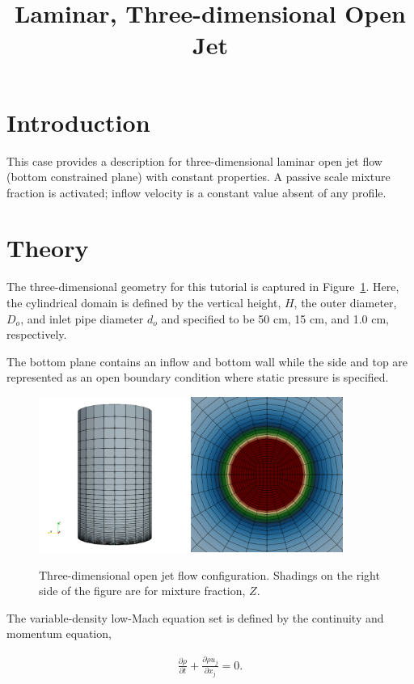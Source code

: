 \documentclass{article}
\title{Laminar, Three-dimensional Open Jet}
\date{}
\begin{document}
\maketitle

\section{Introduction}
This case provides a description for three-dimensional laminar
open jet flow (bottom constrained plane) with constant properties. A passive
scale mixture fraction is activated; inflow velocity is a constant value
absent of any profile.

\section{Theory}
The three-dimensional geometry for this tutorial is captured in 
Figure~\ref{fig:geom}. Here, the cylindrical domain is defined by the 
vertical height, $H$, the outer diameter, $D_o$, and inlet pipe diameter $d_o$ and 
specified to be 50 cm, 15 cm, and 1.0 cm, respectively. 

The bottom plane contains an inflow and bottom wall while the side and top are represented
as an open boundary condition where static pressure is specified.

\begin{figure}[!htbp]
  \centering
  {
   \includegraphics[height=2.0in]{images/3d_hex8_open_jet_geom.png}
  }
  \caption{Three-dimensional open jet flow configuration. Shadings on the
right side of the figure are for mixture fraction, $Z$.}
  \label{fig:geom}
\end{figure}

The variable-density low-Mach equation set is defined by the continuity and momentum equation,

\begin{align}
  \frac {\partial \rho }{\partial t} + \frac{ \partial \rho u_j}{\partial x_j} = 0.
\label{eq:contEq}
\end{align} 
\end{document}
